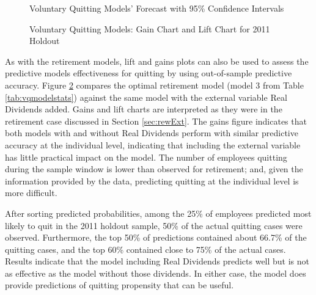 \begin{figure}[]
	\centering
	\caption{Voluntary Quitting Models' Forecast with 95\% Confidence Intervals}
	\label{fig:vqboot}
\end{figure}
\begin{figure}[h!]
	\centering
	\caption{Voluntary Quitting Models: Gain Chart and Lift Chart for 2011 Holdout}
	\label{fig:vqgainlift}
\end{figure}

As with the retirement models, lift and gains plots can also be used to assess the predictive models effectiveness for quitting by using out-of-sample predictive accuracy. Figure \ref{fig:vqgainlift} compares the optimal retirement model (model 3 from Table \ref{tab:vqmodelstats}) against the same model with the external variable Real Dividends added. Gains and lift charts are interpreted as they were in the retirement case discussed in Section \ref{sec:rewExt}. The gains figure indicates that both models with and without Real Dividends perform with similar predictive accuracy at the individual level, indicating that including the external variable has little practical impact on the model. The number of employees quitting during the sample window is lower than observed for retirement; and, given the information provided by the data, predicting quitting at the individual level is more difficult.

After sorting predicted probabilities, among the 25\% of employees predicted most likely to quit in the 2011 holdout sample, 50\% of the actual quitting cases were observed. Furthermore, the top 50\% of predictions contained about 66.7\% of the quitting cases, and the top 60\% contained close to 75\% of the actual cases. Results indicate that the model including Real Dividends predicts well but is not as effective as the model without those dividends. In either case, the model does provide predictions of quitting propensity that can be useful.


